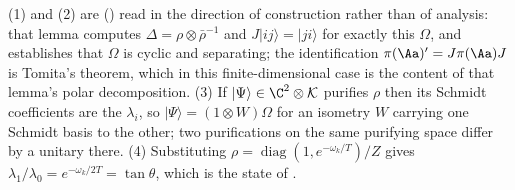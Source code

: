 (1) and (2) are \cite[Lem.~7.1]{ButlerT5} () read in the direction of construction rather than of analysis: that lemma computes $\Delta = \rho\otimes\bar\rho^{-1}$ and $J|ij\rangle = |ji\rangle$ for exactly this $\Omega$, and establishes that $\Omega$ is cyclic and separating; the identification $\pi(\Aa)' = J\pi(\Aa)J$ is Tomita's theorem, which in this finite-dimensional case is the content of that lemma's polar decomposition. (3) If $|\Psi\rangle \in \C^2\otimes\mathcal{K}$ purifies $\rho$ then its Schmidt coefficients are the $\lambda_i$, so $|\Psi\rangle = (1\otimes W)\Omega$ for an isometry $W$ carrying one Schmidt basis to the other; two purifications on the same purifying space differ by a unitary there. (4) Substituting $\rho = \operatorname{diag}(1, e^{-\omega_k/T})/Z$ gives $\lambda_1/\lambda_0 = e^{-\omega_k/2T} = \tan\theta$, which is the state of \cite[Lem.~7.2]{ButlerT5}.
